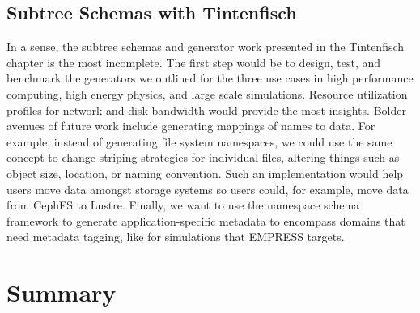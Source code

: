 








\subsection{Subtree Schemas with Tintenfisch}

In a sense, the subtree schemas and generator work presented in the Tintenfisch
chapter is the most incomplete. The first step would be to design, test, and
benchmark the generators we outlined for the three use cases in high
performance computing, high energy physics, and large scale simulations.
Resource utilization profiles for network and disk bandwidth would provide the
most insights. Bolder avenues of future work include generating mappings of
names to data. For example, instead of generating file system namespaces, we
could use the same concept to change striping strategies for individual files,
altering things such as object size, location, or naming convention. Such an
implementation would help users move data amongst storage systems so users
could, for example, move data from CephFS to Lustre. Finally, we want to use
the namespace schema framework to generate application-specific metadata to
encompass domains that need metadata tagging, like for simulations that EMPRESS
targets.

\section{Summary}

